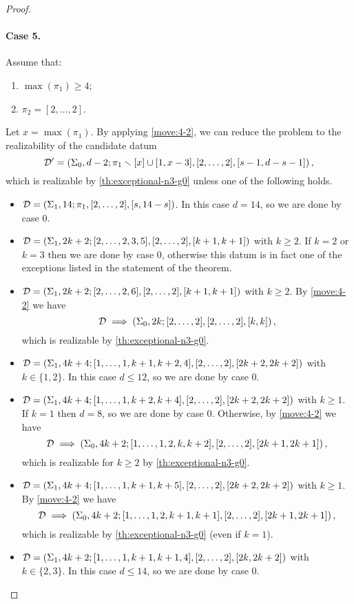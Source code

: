 \documentclass{article}
\begin{document}
\begin{proof}
\paragraph{Case 5.} Assume that:
\begin{enumerate}
\item $\max(\pi_1)\ge 4$;
\item $\pi_2=[2,\ldots,2]$.
\end{enumerate}
Let $x=\max(\pi_1)$. By applying \cref{move:4-2}, we can reduce the problem to the realizability of the candidate datum
\[
\mathcal{D'}=\left(\Sigma_0,d-2;\pi_1\smallsetminus[x]\cup[1,x-3],[2,\ldots,2],[s-1,d-s-1]\right),
\]
which is realizable by \cref{th:exceptional-n3-g0} unless one of the following holds.
\begin{itemize}
\item $\mathcal{D}=\left(\Sigma_1,14;\pi_1,[2,\ldots,2],[s,14-s]\right)$. In this case $d=14$, so we are done by case 0.
\item $\mathcal{D}=\left(\Sigma_1,2k+2;[2,\ldots,2,3,5],[2,\ldots,2],[k+1,k+1]\right)$ with $k\ge 2$. If $k=2$ or $k=3$ then we are done by case 0, otherwise this datum is in fact one of the exceptions listed in the statement of the theorem.
\item $\mathcal{D}=\left(\Sigma_1,2k+2;[2,\ldots,2,6],[2,\ldots,2],[k+1,k+1]\right)$ with $k\ge 2$. By \cref{move:4-2} we have
\[
\mathcal{D}\implies\left(\Sigma_0,2k;[2,\ldots,2],[2,\ldots,2],[k,k]\right),
\]
which is realizable by \cref{th:exceptional-n3-g0}.
\item $\mathcal{D}=\left(\Sigma_1,4k+4;[1,\ldots,1,k+1,k+2,4],[2,\ldots,2],[2k+2,2k+2]\right)$ with $k\in\{1,2\}$. In this case $d\le 12$, so we are done by case 0.
\item $\mathcal{D}=\left(\Sigma_1,4k+4;[1,\ldots,1,k+2,k+4],[2,\ldots,2],[2k+2,2k+2]\right)$ with $k\ge 1$. If $k=1$ then $d=8$, so we are done by case 0. Otherwise, by \cref{move:4-2} we have
\[
\mathcal{D}\implies\left(\Sigma_0,4k+2;[1,\ldots,1,2,k,k+2],[2,\ldots,2],[2k+1,2k+1]\right),
\]
which is realizable for $k\ge 2$ by \cref{th:exceptional-n3-g0}.
\item $\mathcal{D}=\left(\Sigma_1,4k+4;[1,\ldots,1,k+1,k+5],[2,\ldots,2],[2k+2,2k+2]\right)$ with $k\ge 1$. By \cref{move:4-2} we have
\[
\mathcal{D}\implies\left(\Sigma_0,4k+2;[1,\ldots,1,2,k+1,k+1],[2,\ldots,2],[2k+1,2k+1]\right),
\]
which is realizable by \cref{th:exceptional-n3-g0} (even if $k=1$).
\item $\mathcal{D}=\left(\Sigma_1,4k+2;[1,\ldots,1,k+1,k+1,4],[2,\ldots,2],[2k,2k+2]\right)$ with $k\in\{2,3\}$. In this case $d\le 14$, so we are done by case 0.

\end{itemize}
\end{proof}
\end{document}

